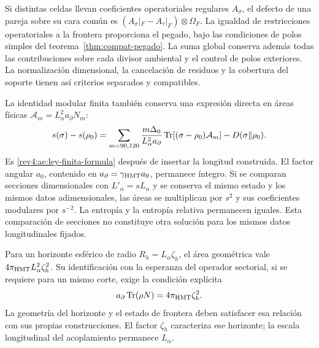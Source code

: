 Si distintas celdas llevan coeficientes operatoriales regulares
\(A_\sigma\), el defecto de una pareja sobre su cara común es
\((A_\sigma|_F-A_\tau|_F)\otimes\Omega_F\).
La igualdad de restricciones operatoriales a la frontera proporciona
el pegado, bajo las condiciones de polos simples del
teorema~\ref{thm:compat-pegado}. La suma global conserva además
todas las contribuciones sobre cada divisor ambiental y el control
de polos exteriores. La normalización dimensional, la cancelación
de residuos y la cobertura del soporte tienen así criterios
separados y compatibles.

La identidad modular finita también conserva una expresión directa
en áreas físicas \(\mathcal A_m=L_\alpha^2a_\partial N_m\):
\begin{equation}
 s(\sigma)-s(\rho_0)
 =\sum_{m=90,120}\frac{m\Delta_0}{L_\alpha^2a_\partial}
   \operatorname{Tr}[(\sigma-\rho_0)\mathcal A_m]
  -D(\sigma\Vert\rho_0).
 \label{rev5:modular-fisica}
\end{equation}
Es \eqref{rev4:ae:ley-finita-formula} después de insertar la
longitud construida. El factor angular \(a_0\), contenido en
\(a_\partial=\gamma_{\rm HMT}a_0\), permanece íntegro.
Si se comparan secciones dimensionales con \(L'_\alpha=sL_\alpha\)
y se conserva el mismo estado y los mismos datos adimensionales,
las áreas se multiplican por \(s^2\) y sus coeficientes modulares
por \(s^{-2}\). La entropía y la entropía relativa permanecen
iguales. Esta comparación de secciones no constituye otra solución
para los mismos datos longitudinales fijados.

Para un horizonte esférico de radio \(R_h=L_\alpha\zeta_h\),
el área geométrica vale \(4\pi_{\rm HMT}L_\alpha^2\zeta_h^2\).
Su identificación con la esperanza del operador sectorial, si se
requiere para un mismo corte, exige la condición explícita
\[
 a_\partial\operatorname{Tr}(\rho N)=4\pi_{\rm HMT}\zeta_h^2.
\]
La geometría del horizonte y el estado de frontera deben satisfacer
esa relación con sus propias construcciones. El factor
\(\zeta_h\) caracteriza ese horizonte; la escala longitudinal
del acoplamiento permanece \(L_\alpha\).
